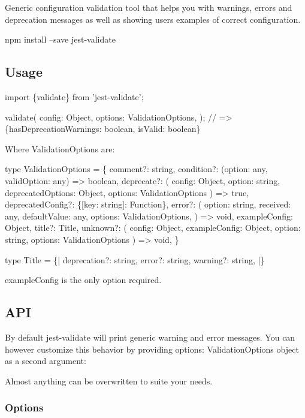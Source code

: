 Generic configuration validation tool that helps you with warnings, errors and deprecation messages as well as showing users examples of correct configuration.


\begin{DoxyCode}
npm install --save jest-validate
\end{DoxyCode}


\subsection*{Usage}


\begin{DoxyCode}
import \{validate\} from 'jest-validate';

validate(
  config: Object,
  options: ValidationOptions,
); // => \{hasDeprecationWarnings: boolean, isValid: boolean\}
\end{DoxyCode}


Where {\ttfamily Validation\+Options} are\+: 
\begin{DoxyCode}
type ValidationOptions = \{
  comment?: string,
  condition?: (option: any, validOption: any) => boolean,
  deprecate?: (
    config: Object,
    option: string,
    deprecatedOptions: Object,
    options: ValidationOptions
  ) => true,
  deprecatedConfig?: \{[key: string]: Function\},
  error?: (
    option: string,
    received: any,
    defaultValue: any,
    options: ValidationOptions,
  ) => void,
  exampleConfig: Object,
  title?: Title,
  unknown?: (
    config: Object,
    exampleConfig: Object,
    option: string,
    options: ValidationOptions
  ) => void,
\}

type Title = \{|
  deprecation?: string,
  error?: string,
  warning?: string,
|\}
\end{DoxyCode}


{\ttfamily example\+Config} is the only option required.

\subsection*{A\+PI}

By default {\ttfamily jest-\/validate} will print generic warning and error messages. You can however customize this behavior by providing {\ttfamily options\+: Validation\+Options} object as a second argument\+:

Almost anything can be overwritten to suite your needs.

\subsubsection*{Options}


